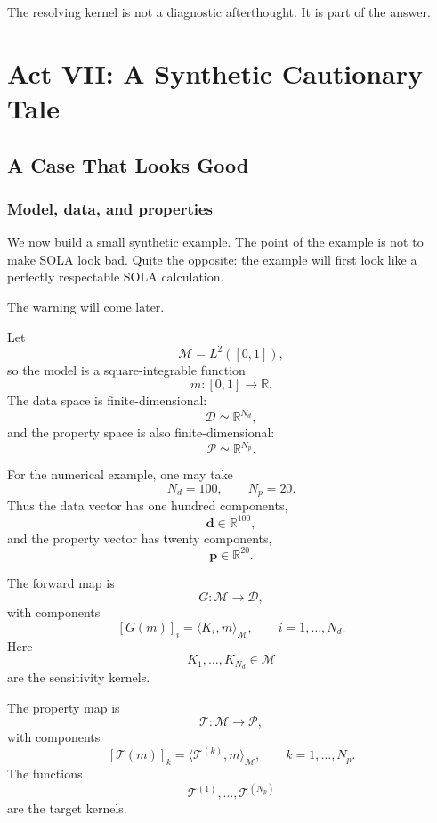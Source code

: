 \documentclass[11pt,openany]{book}
\theoremstyle{definition}
\theoremstyle{remark}
\newcommand{\M}{\mathcal M}
\newcommand{\D}{\mathcal D}
\newcommand{\Pspace}{\mathcal P}
\newcommand{\Tau}{\mathcal{T}}
\begin{document}
\begin{lessonbox}
The resolving kernel is not a diagnostic afterthought. It is part of the answer.
\end{lessonbox}


\part{Act VII: A Synthetic Cautionary Tale}

\chapter{A Case That Looks Good}

\section{Model, data, and properties}

We now build a small synthetic example. The point of the example is not to make SOLA look bad.
Quite the opposite: the example will first look like a perfectly respectable SOLA calculation.

The warning will come later.

Let
\[
  \M=L^2([0,1]),
\]
so the model is a square-integrable function
\[
  m:[0,1]\to\mathbb R.
\]
The data space is finite-dimensional:
\[
  \D\simeq\mathbb R^{N_d},
\]
and the property space is also finite-dimensional:
\[
  \Pspace\simeq\mathbb R^{N_p}.
\]

For the numerical example, one may take
\[
  N_d=100,
  \qquad
  N_p=20.
\]
Thus the data vector has one hundred components,
\[
  \mathbf d\in\mathbb R^{100},
\]
and the property vector has twenty components,
\[
  \mathbf p\in\mathbb R^{20}.
\]

The forward map is
\[
  G:\M\to\D,
\]
with components
\[
  [G(m)]_i
  =
  \langle K_i,m\rangle_{\M},
  \qquad i=1,\dots,N_d.
\]
Here
\[
  K_1,\dots,K_{N_d}\in\M
\]
are the sensitivity kernels.

The property map is
\[
  \Tau:\M\to\Pspace,
\]
with components
\[
  [\Tau(m)]_k
  =
  \langle \mathcal T^{(k)},m\rangle_{\M},
  \qquad k=1,\dots,N_p.
\]
The functions
\[
  \mathcal T^{(1)},\dots,\mathcal T^{(N_p)}
\]
are the target kernels.
\end{document}
